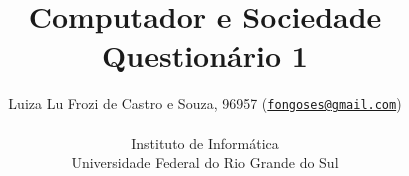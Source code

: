 %
%
%
%

%

\documentclass[a4paper]{article}

\usepackage[brazil]{babel}
\usepackage[utf8]{inputenc}
\usepackage{amsmath}
\usepackage{graphicx}
\usepackage[colorinlistoftodos]{todonotes}
\usepackage{hyperref}
\usepackage{listings}
\usepackage[]{mcode}
\usepackage{gensymb}
\usepackage{textcomp}
\usepackage{multirow,colortbl,array} %


\title{
Computador e Sociedade \\ 
Questionário 1
}

\author{
Luiza Lu Frozi de Castro e Souza, 96957 (\texttt{\href{mailto:fongoses@gmail.com}{fongoses@gmail.com}})\\
\\
Instituto de Informática \\
Universidade Federal do Rio Grande do Sul
}

